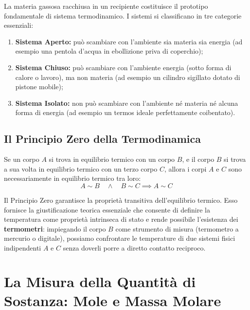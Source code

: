 \documentclass[11pt,a4paper,oneside]{report}
\begin{document}
La materia gassosa racchiusa in un recipiente costituisce il prototipo fondamentale di sistema termodinamico. I sistemi si classificano in tre categorie essenziali:
\begin{enumerate}
  \item \textbf{Sistema Aperto:} pu\`o scambiare con l'ambiente sia materia sia energia (ad esempio una pentola d'acqua in ebollizione priva di coperchio);
  \item \textbf{Sistema Chiuso:} pu\`o scambiare con l'ambiente energia (sotto forma di calore o lavoro), ma non materia (ad esempio un cilindro sigillato dotato di pistone mobile);
  \item \textbf{Sistema Isolato:} non pu\`o scambiare con l'ambiente n\'e materia n\'e alcuna forma di energia (ad esempio un termos ideale perfettamente coibentato).
\end{enumerate}

\section{Il Principio Zero della Termodinamica}

\begin{leggefisica}
Se un corpo $A$ si trova in equilibrio termico con un corpo $B$, e il corpo $B$ si trova a sua volta in equilibrio termico con un terzo corpo $C$, allora i corpi $A$ e $C$ sono necessariamente in equilibrio termico tra loro:
\[
A \sim B \quad \land \quad B \sim C \implies A \sim C
\]
\end{leggefisica}

\begin{commento}
Il Principio Zero garantisce la propriet\`a transitiva dell'equilibrio termico. Esso fornisce la giustificazione teorica essenziale che consente di definire la temperatura come propriet\`a intrinseca di stato e rende possibile l'esistenza dei \textbf{termometri}: impiegando il corpo $B$ come strumento di misura (termometro a mercurio o digitale), possiamo confrontare le temperature di due sistemi fisici indipendenti $A$ e $C$ senza doverli porre a diretto contatto reciproco.
\end{commento}

\chapter{La Misura della Quantit\`a di Sostanza: Mole e Massa Molare}
\end{document}
